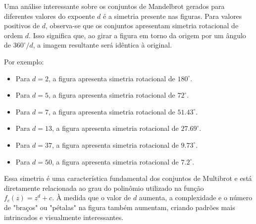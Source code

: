 \begin{enumerate}
        Uma análise interessante sobre os conjuntos de Mandelbrot gerados para diferentes valores do expoente $d$ é a simetria presente nas figuras. Para valores positivos de $d$, observa-se que os conjuntos apresentam simetria rotacional de ordem $d$. Isso significa que, ao girar a figura em torno da origem por um ângulo de $360^\circ / d$\cite{peitgen1986beauty}, a imagem resultante será idêntica à original.

        Por exemplo:
        \begin{itemize}
                \item Para $d = 2$, a figura apresenta simetria rotacional de $180^\circ$.
                \item Para $d = 5$, a figura apresenta simetria rotacional de $72^\circ$.
                \item Para $d = 7$, a figura apresenta simetria rotacional de $51.43^\circ$.
                \item Para $d = 13$, a figura apresenta simetria rotacional de $27.69^\circ$.
                \item Para $d = 37$, a figura apresenta simetria rotacional de $9.73^\circ$.
                \item Para $d = 50$, a figura apresenta simetria rotacional de $7.2^\circ$.
        \end{itemize}

        Essa simetria é uma característica fundamental dos conjuntos de Multibrot e está diretamente relacionada ao grau do polinômio utilizado na função $f_c(z) = z^d + c$. À medida que o valor de $d$ aumenta, a complexidade e o número de "braços" ou "pétalas" na figura também aumentam, criando padrões mais intrincados e visualmente interessantes.

\end{enumerate}
